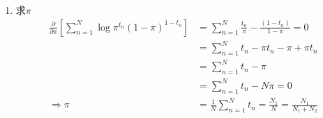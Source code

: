 \begin{enumerate}
	\item 求$\pi$
	\begin{equation}
	\begin{aligned}
	\frac{\partial }{\partial\pi}\left[\sum\limits_{n=1}^{N}\log \pi^{t_n}(1-\pi)^{1-t_n} \right]&=\sum_{n=1}^{N}\frac{t_n}{\pi}-\frac{(1-t_n)}{1-\pi}=0\\
	&=\sum_{n=1}^{N}t_n-\pi t_n -\pi +\pi t_n\\
	&=\sum_{n=1}^{N}t_n-\pi\\
	&=\sum_{n=1}^{N}t_n-N\pi=0\\
	\Rightarrow \pi &= \frac{1}{N}\sum_{n=1}^{N}t_n=\frac{N_1}{N}=\frac{N_1}{N_1+N_2}\\
	\end{aligned}
	\end{equation}
	

\end{enumerate}
